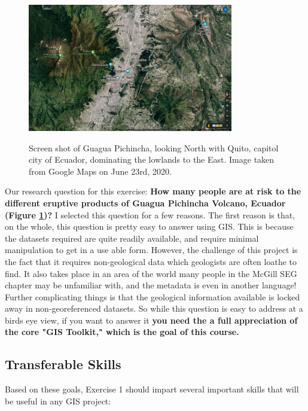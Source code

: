 \documentclass{article}
\begin{document}
\begin{figure}[htbp]
    \centering
    \includegraphics[width=0.8\textwidth]{Google Map Overview of GP and Quito.png}
    \label{fig:fig1}
    \caption{Screen shot of Guagua Pichincha, looking North with Quito, capitol city of Ecuador, dominating the lowlands to the East. Image taken from Google Maps on June 23rd, 2020. }
\end{figure}

Our research question for this exercise: \textbf{How many people are at risk to the different eruptive products of Guagua Pichincha Volcano, Ecuador (Figure \ref{fig:fig1})?} I selected this question for a few reasons. The first reason is that, on the whole, this question is pretty easy to answer using GIS. This is because the datasets required are quite readily available, and require minimal manipulation to get in a use able form. However, the challenge of this project is the fact that it requires non-geological data which geologists are often loathe to find. It also takes place in an area of the world many people in the McGill SEG chapter may be unfamiliar with, and the metadata is even in another language! Further complicating things is that the geological information available is locked away in non-georeferenced datasets. So while this question is easy to address at a birds eye view, if you want to answer it \textbf{you need the a full appreciation of the core "GIS Toolkit," which is the goal of this course.}

\subsection{Transferable Skills}

Based on these goals, Exercise 1 should impart several important skills that will be useful in any GIS project:
\end{document}
